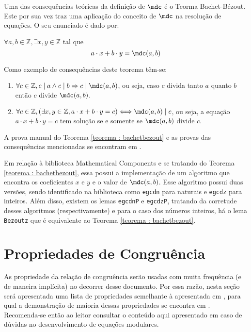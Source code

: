 Uma das consequências teóricas da definição de $\mdc$ é o Teorma Bachet-Bézout. Este por sua vez traz uma aplicação do conceito de $\mdc$ na resolução de equações. O seu enunciado é dado por:
\begin{teorema} \label{teorema : bachetbezout}
    $\forall a, b \in \mathbb{Z}, \exists x, y \in \mathbb{Z}$ tal que
    \begin{equation*}
        a \cdot x + b \cdot y = \mdc(a, b)
    \end{equation*}
\end{teorema}
\noindent
Como exemplo de consequências deste teorema têm-se:
\begin{enumerate}
    \item $\forall c \in \mathbb{Z}, c \mid a \land c \mid b \Rightarrow c \mid \mdc(a, b)$, ou seja, caso $c$ divida tanto $a$ quanto $b$ então $c$ divide $\mdc(a, b)$.
    \item $\forall c \in \mathbb{Z}, (\exists x, y \in \mathbb{Z}, a \cdot x + b \cdot y = c) \Longleftrightarrow \mdc(a, b) \mid c $, ou seja, a equação $a \cdot x + b \cdot y = c$ tem solução se e somente se $\mdc(a, b)$ divide $c$.
\end{enumerate}
A prova manual do Teorema \ref{teorema : bachetbezout} e as provas das consequências mencionadas se encontram em \cite[p.~20-21]{book:2399854}. 

    Em relação à biblioteca Mathematical Components e se tratando do Teorema \ref{teorema : bachetbezout}, essa possui a implementação de um algoritmo
    que encontra os coeficientes $x$ e $y$ e o valor de $\mdc(a,b)$. Esse algoritmo possui duas versões, sendo identificado na biblioteca como \lstinline[language = coq]{egcdn} para naturais e \lstinline[language = coq]{egcdz} para inteiros. Além disso, existem os lemas \lstinline[language = coq]{egcdnP} e \lstinline[language = coq]{egcdzP}, tratando da corretude desses algoritmos (respectivamente) e para o caso dos números inteiros, há o lema \lstinline[language = coq]{Bezoutz} que é equivalente ao Teorema \ref{teorema : bachetbezout}.

\section{Propriedades de Congruência}
As propriedade da relação de congruência serão usadas com muita frequência (e de maneira implícita) no decorrer desse documento. Por essa razão, nesta seção será apresentada uma lista de propriedades semelhante à apresentada em \cite[p.~34]{book:2399854}, para qual a demonstração de maioria dessas propriedades se encontra em \cite[p.~34-35]{book:2399854}. Recomenda-se então ao leitor consultar o conteúdo aqui apresentado em caso de dúvidas no desenvolvimento de equações modulares.
    
